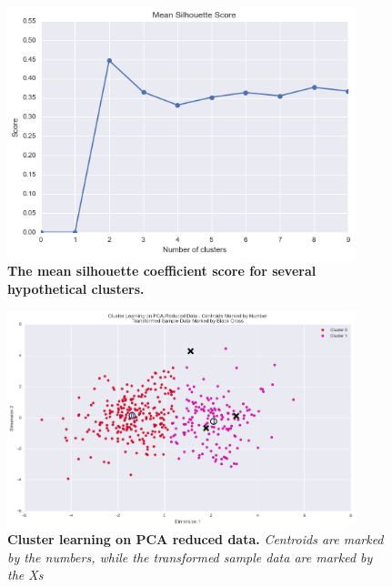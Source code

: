 \documentclass[twoside,openright,titlepage,numbers=noenddot,headinclude,%
               footinclude=true,cleardoublepage=empty,abstractoff,BCOR=5mm,%
               paper=a4,fontsize=11pt,ngerman,american]{scrreprt}
\numberwithin{theorem}{chapter}
\numberwithin{definition}{chapter}
\numberwithin{algorithm}{chapter}
\numberwithin{figure}{chapter}
\numberwithin{table}{chapter}
\numberwithin{equation}{chapter}
\begin{document}
\begin{figure}[!hbtp]
\centering
    
    \includegraphics[width=0.9\textwidth]{figures/meanSilhouetteScore}
    
    \caption{\textbf{The mean silhouette coefficient score for several hypothetical clusters.}}\label{meanSilhouetteScore}
\end{figure}


\begin{figure}[!hbtp]
\centering
    
    \includegraphics[width=0.9\textwidth]{figures/kMeansModelResults}
    
    \caption{\textbf{Cluster learning on PCA reduced data.} \textit{Centroids are marked by the numbers, while the transformed sample data are marked by the Xs}}\label{kMeansModelResults}
\end{figure}



\end{document}
